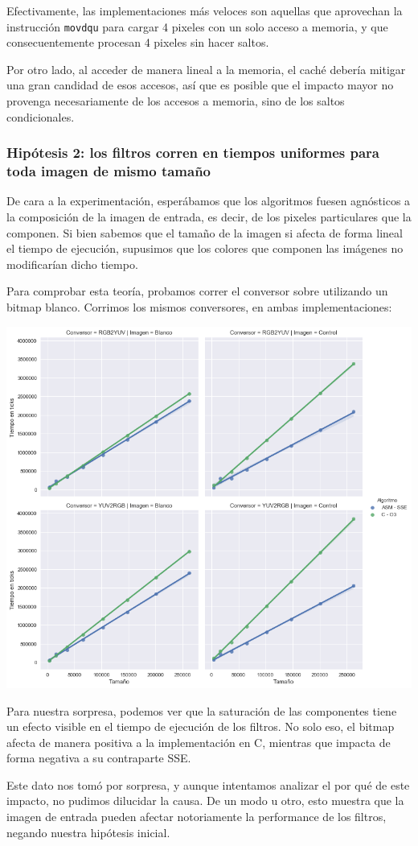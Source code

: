 Efectivamente, las implementaciones más veloces son aquellas que aprovechan la instrucción \texttt{movdqu} para cargar 4 pixeles con un solo acceso a memoria, y que consecuentemente procesan 4 pixeles sin hacer saltos.

Por otro lado, al acceder de manera lineal a la memoria, el caché debería mitigar una gran candidad de esos accesos, así que es posible que el impacto mayor no provenga necesariamente de los accesos a memoria, sino de los saltos condicionales.

\subsubsection*{Hipótesis 2: los filtros corren en tiempos uniformes para toda imagen de mismo tamaño}

De cara a la experimentación, esperábamos que los algoritmos fuesen agnósticos a la composición de la imagen de entrada, es decir, de los pixeles particulares que la componen. Si bien sabemos que el tamaño de la imagen si afecta de forma lineal el tiempo de ejecución, supusimos que los colores que componen las imágenes no modificarían dicho tiempo.

Para comprobar esta teoría, probamos correr el conversor sobre utilizando un bitmap blanco. Corrimos los mismos conversores, en ambas implementaciones:

\begin{center}
	\includegraphics[scale=0.5]{img/conversores_blanco.png}
\end{center}

Para nuestra sorpresa, podemos ver que la saturación de las componentes tiene un efecto visible en el tiempo de ejecución de los filtros. No solo eso, el bitmap afecta de manera positiva a la implementación en C, mientras que impacta de forma negativa a su contraparte SSE.

Este dato nos tomó por sorpresa, y aunque intentamos analizar el por qué de este impacto, no pudimos dilucidar la causa. De un modo u otro, esto muestra que la imagen de entrada pueden afectar notoriamente la performance de los filtros, negando nuestra hipótesis inicial.